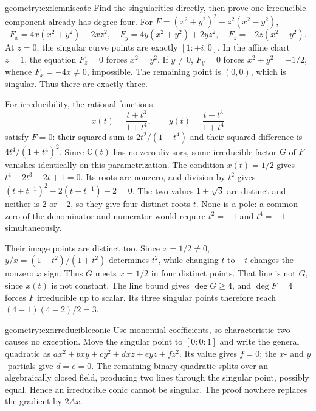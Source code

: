 \begin{solution}{geometry:ex:lemniscate}
\idea Find the singularities directly, then prove one irreducible component already has degree four.
\writeup For $F=(x^2+y^2)^2-z^2(x^2-y^2)$,
\[
F_x=4x(x^2+y^2)-2xz^2,\quad F_y=4y(x^2+y^2)+2yz^2,
\quad F_z=-2z(x^2-y^2).
\]
At $z=0$, the singular curve points are exactly $[1:\pm i:0]$. In the affine chart $z=1$, the equation $F_z=0$ forces $x^2=y^2$. If $y\ne0$, $F_y=0$ forces $x^2+y^2=-1/2$, whence $F_x=-4x\ne0$, impossible. The remaining point is $(0,0)$, which is singular. Thus there are exactly three.

For irreducibility, the rational functions
\[
x(t)=\frac{t+t^3}{1+t^4},\qquad y(t)=\frac{t-t^3}{1+t^4}
\]
satisfy $F=0$: their squared sum is $2t^2/(1+t^4)$ and their squared difference is $4t^4/(1+t^4)^2$. Since $\mathbb C(t)$ has no zero divisors, some irreducible factor $G$ of $F$ vanishes identically on this parametrization. The condition $x(t)=1/2$ gives $t^4-2t^3-2t+1=0$. Its roots are nonzero, and division by $t^2$ gives $(t+t^{-1})^2-2(t+t^{-1})-2=0$. The two values $1\pm\sqrt3$ are distinct and neither is $2$ or $-2$, so they give four distinct roots $t$. None is a pole: a common zero of the denominator and numerator would require $t^2=-1$ and $t^4=-1$ simultaneously.

Their image points are distinct too. Since $x=1/2\ne0$, $y/x=(1-t^2)/(1+t^2)$ determines $t^2$, while changing $t$ to $-t$ changes the nonzero $x$ sign. Thus $G$ meets $x=1/2$ in four distinct points. That line is not $G$, since $x(t)$ is not constant. The line bound gives $\deg G\ge4$, and $\deg F=4$ forces $F$ irreducible up to scalar. Its three singular points therefore reach $(4-1)(4-2)/2=3$.
\end{solution}
\begin{solution}{geometry:ex:irreducibleconic}
\idea Use monomial coefficients, so characteristic two causes no exception.
\writeup Move the singular point to $[0:0:1]$ and write the general quadratic as $ax^2+bxy+cy^2+dxz+eyz+fz^2$. Its value gives $f=0$; the $x$- and $y$-partials give $d=e=0$. The remaining binary quadratic splits over an algebraically closed field, producing two lines through the singular point, possibly equal. Hence an irreducible conic cannot be singular. The proof nowhere replaces the gradient by $2Ax$.
\end{solution}
